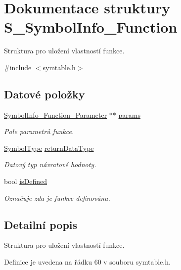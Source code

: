 \hypertarget{struct_s___symbol_info___function}{}\section{Dokumentace struktury S\+\_\+\+Symbol\+Info\+\_\+\+Function}
\label{struct_s___symbol_info___function}


Struktura pro uložení vlastností funkce.  




{\ttfamily \#include $<$symtable.\+h$>$}

\subsection*{Datové položky}
\begin{DoxyCompactItemize}
\item 
\hyperlink{symtable_8h_a6f66814120a40ef33089435deec15f47}{Symbol\+Info\+\_\+\+Function\+\_\+\+Parameter} $\ast$$\ast$ \hyperlink{struct_s___symbol_info___function_a523efb68a2dc227e238af5fc1e1e38e0}{params}
\begin{DoxyCompactList}\small\item\em Pole parametrů funkce. \end{DoxyCompactList}\item 
\hyperlink{symtable_8h_a623952f6aa67a355a3840e25272b1c91}{Symbol\+Type} \hyperlink{struct_s___symbol_info___function_a4ce26a8194ccedd60da46576f0fb9453}{return\+Data\+Type}
\begin{DoxyCompactList}\small\item\em Datový typ návratové hodnoty. \end{DoxyCompactList}\item 
bool \hyperlink{struct_s___symbol_info___function_a8d55fb364b94ff0817d5b981f08ad26b}{is\+Defined}
\begin{DoxyCompactList}\small\item\em Označuje zda je funkce definována. \end{DoxyCompactList}\end{DoxyCompactItemize}


\subsection{Detailní popis}
Struktura pro uložení vlastností funkce. 

Definice je uvedena na řádku 60 v souboru symtable.\+h.



